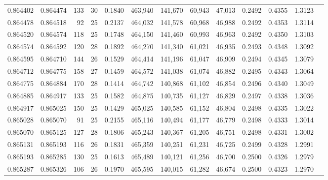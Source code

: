 \begin{tabular}{rrrrrrrrrrrrr}
0.864402 & 0.864474 &   133 &  30 &                                     0.1840 & 463,940 & 141,670 &  60,943 &  47,013 & 0.2492 & 0.4355 & 1.3123 \\
0.864478 & 0.864518 &    92 &  25 &                                     0.2137 & 464,032 & 141,578 &  60,968 &  46,988 & 0.2492 & 0.4353 & 1.3114 \\
0.864520 & 0.864574 &   118 &  25 &                                     0.1748 & 464,150 & 141,460 &  60,993 &  46,963 & 0.2492 & 0.4350 & 1.3103 \\
0.864574 & 0.864592 &   120 &  28 &                                     0.1892 & 464,270 & 141,340 &  61,021 &  46,935 & 0.2493 & 0.4348 & 1.3092 \\
0.864595 & 0.864710 &   144 &  26 &                                     0.1529 & 464,414 & 141,196 &  61,047 &  46,909 & 0.2494 & 0.4345 & 1.3079 \\
0.864712 & 0.864775 &   158 &  27 &                                     0.1459 & 464,572 & 141,038 &  61,074 &  46,882 & 0.2495 & 0.4343 & 1.3064 \\
0.864775 & 0.864884 &   170 &  28 &                                     0.1414 & 464,742 & 140,868 &  61,102 &  46,854 & 0.2496 & 0.4340 & 1.3049 \\
0.864885 & 0.864917 &   133 &  25 &                                     0.1582 & 464,875 & 140,735 &  61,127 &  46,829 & 0.2497 & 0.4338 & 1.3036 \\
0.864917 & 0.865025 &   150 &  25 &                                     0.1429 & 465,025 & 140,585 &  61,152 &  46,804 & 0.2498 & 0.4335 & 1.3022 \\
0.865028 & 0.865070 &    91 &  25 &                                     0.2155 & 465,116 & 140,494 &  61,177 &  46,779 & 0.2498 & 0.4333 & 1.3014 \\
0.865070 & 0.865125 &   127 &  28 &                                     0.1806 & 465,243 & 140,367 &  61,205 &  46,751 & 0.2498 & 0.4331 & 1.3002 \\
0.865131 & 0.865193 &   116 &  26 &                                     0.1831 & 465,359 & 140,251 &  61,231 &  46,725 & 0.2499 & 0.4328 & 1.2991 \\
0.865193 & 0.865285 &   130 &  25 &                                     0.1613 & 465,489 & 140,121 &  61,256 &  46,700 & 0.2500 & 0.4326 & 1.2979 \\
0.865287 & 0.865326 &   106 &  26 &                                     0.1970 & 465,595 & 140,015 &  61,282 &  46,674 & 0.2500 & 0.4323 & 1.2970 \\

\end{tabular}
